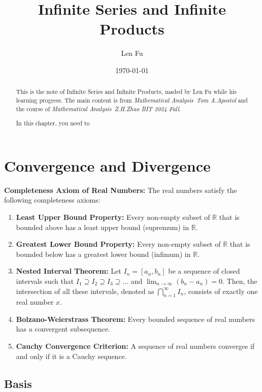 \documentclass{article}
\title{Infinite Series and Infinite Products}
\author{Len Fu}
\date{\today}
\theoremstyle{definition}
\begin{document}
\maketitle

\begin{abstract}
This is the note of Infinite Series and Infinite Products,
 maded by Len Fu while his learning progress.
 The main content is from \textit{Mathematical Analysis\ Tom A.Apostol} and the course of \textit{Mathematical Analysis\ Z.H.Zhao BIT 2024 Fall}.

In this chapter,  you need to 
\end{abstract}
\newpage

\renewcommand{\contentsname}{Contents}
\tableofcontents
\newpage



\section{Convergence and Divergence}

\textbf{Completeness Axiom of Real Numbers:} The real numbers satisfy the following completeness axioms:

\begin{enumerate}
    \item \textbf{Least Upper Bound Property:} Every non-empty subset of \(\mathbb{R}\) that is bounded above has a least upper bound (supremum) in \(\mathbb{R}\).
    \item \textbf{Greatest Lower Bound Property:} Every non-empty subset of \(\mathbb{R}\) that is bounded below has a greatest lower bound (infimum) in \(\mathbb{R}\).
    \item \textbf{Nested Interval Theorem:} Let \(I_n = [a_n, b_n]\) be a sequence of closed intervals such that \(I_1 \supseteq I_2 \supseteq I_3 \supseteq \ldots\) and \(\lim_{n \to \infty} (b_n - a_n) = 0\). Then, the intersection of all these intervals, denoted as \(\bigcap_{n=1}^{\infty} I_n\), consists of exactly one real number \(x\).
    \item \textbf{Bolzano-Weierstrass Theorem:} Every bounded sequence of real numbers has a convergent subsequence.
    \item \textbf{Cauchy Convergence Criterion:} A sequence of real numbers converges if and only if it is a Cauchy sequence.
\end{enumerate}


\subsection{Basis}
\end{document}
